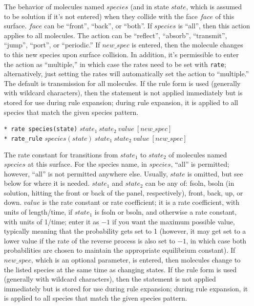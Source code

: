 \documentclass {scrbook}
\newcommand {\ttt} {\texttt}
\begin{document}
\begin{description}
The behavior of molecules named $species$ (and in state $state$, which is assumed to be solution if it's not entered) when they collide with the face $face$ of this surface. $face$ can be ``front'', ``back'', or ``both''. If $species$ is ``all'', then this action applies to all molecules. The action can be ``reflect'', ``absorb'', ``transmit'', ``jump'', ``port'', or ``periodic.'' If $new\_spec$ is entered, then the molecule changes to this new species upon surface collision. In addition, it's permissible to enter the action as ``multiple,'' in which case the rates need to be set with \ttt{rate}; alternatively, just setting the rates will automatically set the action to ``multiple.'' The default is transmission for all molecules. If the rule form is used (generally with wildcard characters), then the statement is not applied immediately but is stored for use during rule expansion; during rule expansion, it is applied to all species that match the given species pattern.

\item{\ttt{* rate species(state)} $state_1\ state_2\ value\ [new\_spec]$\\
\ttt{* rate\_rule} $species(state)\ state_1\ state_2\ value\ [new\_spec]$}

The rate constant for transitions from $state_1$ to $state_2$ of molecules named $species$ at this surface. For the species name, in $species$, ``all'' is permitted; however, ``all'' is not permitted anywhere else. Usually, $state$ is omitted, but see below for where it is needed. $state_1$ and $state_2$ can be any of: fsoln, bsoln (in solution, hitting the front or back of the panel, respectively), front, back, up, or down. $value$ is the rate constant or rate coefficient; it is a rate coefficient, with units of length/time, if $state_1$ is fsoln or bsoln, and otherwise a rate constant, with units of 1/time; enter it as $-1$ if you want the maximum possible value, typically meaning that the probability gets set to 1 (however, it may get set to a lower value if the rate of the reverse process is also set to $-1$, in which case both probabilities are chosen to maintain the appropriate equilibrium constant). If $new\_spec$, which is an optional parameter, is entered, then molecules change to the listed species at the same time as changing states. If the rule form is used (generally with wildcard characters), then the statement is not applied immediately but is stored for use during rule expansion; during rule expansion, it is applied to all species that match the given species pattern.


\end{description}
\end{document}
